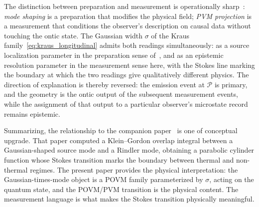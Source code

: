 \documentclass[12pt,a4paper]{article}
\begin{document}
The distinction between preparation and measurement is operationally sharp~\cite{harrigan2010einstein}: 
\textit{mode shaping} is a preparation that modifies the physical 
field; \textit{PVM projection} is a measurement that conditions the 
observer's description on causal data without touching the ontic state. 
The Gaussian width $\sigma$ of the Kraus 
family~\eqref{eq:kraus_longitudinal} admits both readings 
simultaneously: as a source localization parameter in the 
preparation sense of~\cite{player2025driving}, and as an epistemic 
resolution parameter in the measurement sense here, with the Stokes 
line marking the boundary at which the two readings give qualitatively 
different physics. The direction of explanation is thereby reversed: 
the emission event at $\mathcal{P}$ is primary, and the geometry is 
the ontic output of the subsequent measurement events, while the 
assignment of that output to a particular observer's microstate 
record remains epistemic.

Summarizing, the relationship to the companion paper~\cite{player2025driving} 
is one of conceptual upgrade. That paper computed a 
Klein--Gordon overlap integral between a Gaussian-shaped 
source mode and a Rindler mode, obtaining a parabolic 
cylinder function whose Stokes transition marks the boundary 
between thermal and non-thermal regimes. The present paper 
provides the physical interpretation: the Gaussian-times-mode 
object is a POVM family parameterized by $\sigma$, acting on 
the quantum state, and the POVM/PVM transition is the 
physical content.
The measurement language is what makes the Stokes transition physically meaningful.
\end{document}
